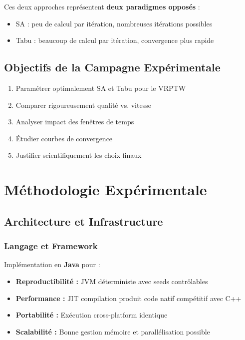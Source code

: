 \documentclass[12pt,a4paper,twoside]{report}
\begin{document}
Ces deux approches représentent \textbf{deux paradigmes opposés} :
\begin{itemize}
    \item SA : peu de calcul par itération, nombreuses itérations possibles
    \item Tabu : beaucoup de calcul par itération, convergence plus rapide
\end{itemize}

\section{Objectifs de la Campagne Expérimentale}

\begin{enumerate}
    \item Paramétrer optimalement SA et Tabu pour le VRPTW
    \item Comparer rigoureusement qualité vs. vitesse
    \item Analyser impact des fenêtres de temps
    \item Étudier courbes de convergence
    \item Justifier scientifiquement les choix finaux
\end{enumerate}

\chapter{Méthodologie Expérimentale}

\section{Architecture et Infrastructure}

\subsection{Langage et Framework}

Implémentation en \textbf{Java} pour :
\begin{itemize}
    \item \textbf{Reproductibilité :} JVM déterministe avec seeds contrôlables
    \item \textbf{Performance :} JIT compilation produit code natif compétitif avec C++
    \item \textbf{Portabilité :} Exécution cross-platform identique
    \item \textbf{Scalabilité :} Bonne gestion mémoire et parallélisation possible
\end{itemize}
\end{document}
